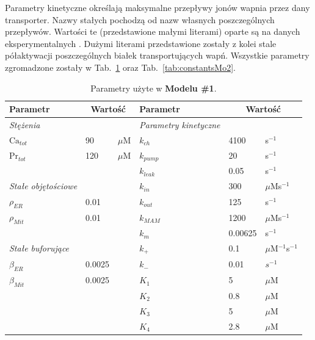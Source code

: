 \medskip 

Parametry kinetyczne określają maksymalne przepływy jonów wapnia przez dany transporter. Nazwy stałych pochodzą od nazw własnych poszczególnych przepływów. Wartości te (przedstawione małymi literami) oparte są na danych eksperymentalnych \cite{Marhl2000}. Dużymi literami przedstawione zostały z kolei stale półaktywacji poszczególnych białek transportujących wapń. Wszystkie parametry zgromadzone zostały w Tab.~\ref{tab:constantsMo1} oraz Tab.~\ref{tab:constantsMo2}.

\bigskip

\begin{table}[!ht]
	\centering
	\begin{tabular} {@{} l l l l l l @{}}
		\toprule[0.12em]
		Parametr 						& \multicolumn{2}{c}{Wartość} 	& Parametr			&\multicolumn{2}{c}{Wartość}			\\ \midrule[0.06em]
		\textit{Stężenia} 			&			& 			& \textit{Parametry kinetyczne}	& 			& 						\\
		$\textrm{Ca}_{tot}$				&	90		& $\mu$M	& $k_{ch}$					& 4100		& s$^{-1}$ 				\\
		$\textrm{Pr}_{tot}$				&	120		& $\mu$M	& $k_{pump}$				& 20 		& s$^{-1}$ 				\\
		&			&			& $k_{leak}$				& 0.05		& s$^{-1}$ 				\\
		\textit{Stałe objętościowe}			&			&			& $k_{in}$					& 300		& $\mu$Ms$^{-1}$		\\
		$\rho_{ER}$						&	0.01 	&			& $k_{out}$					& 125 		& s$^{-1}$ 				\\
		$\rho_{Mit}$					&	0.01	&			& $k_{MAM}$					& 1200		& $\mu$Ms$^{-1}$		\\
		&			&			& $k_{m}$					& 0.00625	& s$^{-1}$				\\
		\textit{Stałe buforujące}	&			&			& $k_{+}$					& 0.1		& $\mu$M$^{-1}$s$^{-1}$	\\
		$\beta_{ER}$					&	0.0025	&			& $k_{-}$					& 0.01		& $s^{-1}$				\\
		$\beta_{Mit}$					&	0.0025	&			& $K_{1}$					& 5			& $\mu$M				\\
		&			&			& $K_{2}$					& 0.8 		& $\mu$M				\\
		&			&			& $K_{3}$					& 5			& $\mu$M				\\
		&			&			& $K_{4}$					& 2.8		& $\mu$M				\\\bottomrule[0.12em]
	\end{tabular}
	\caption[Parametry użyte w Modelu \#1]{Parametry użyte w \textbf{Modelu \#1}.}
	\label{tab:constantsMo1}
\end{table}

